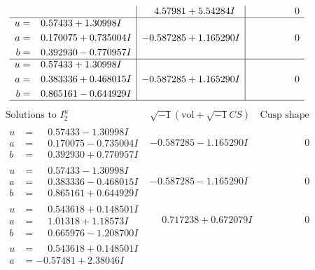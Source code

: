 \documentclass[1p]{elsarticle_modified}
\theoremstyle{definition}
\newcommand{\I}{\sqrt{-1}}
\begin{document}
$$\begin{array}{c|c|c}
 & \phantom{-}4.57981 + 5.54284 I & \phantom{-0.000000 } 0 \\ \hline\begin{aligned}
u &= \phantom{-}0.57433 + 1.30998 I \\
a &= \phantom{-}0.170075 + 0.735004 I \\
b &= \phantom{-}0.392930 - 0.770957 I\end{aligned}
 & -0.587285 + 1.165290 I & \phantom{-0.000000 } 0 \\ \hline\begin{aligned}
u &= \phantom{-}0.57433 + 1.30998 I \\
a &= \phantom{-}0.383336 + 0.468015 I \\
b &= \phantom{-}0.865161 - 0.644929 I\end{aligned}
 & -0.587285 + 1.165290 I & \phantom{-0.000000 } 0\\
 \hline 
 \end{array}$$\newpage$$\begin{array}{c|c|c}  
\text{Solutions to }I^u_{2}& \I (\text{vol} + \sqrt{-1}CS) & \text{Cusp shape}\\
 \hline 
\begin{aligned}
u &= \phantom{-}0.57433 - 1.30998 I \\
a &= \phantom{-}0.170075 - 0.735004 I \\
b &= \phantom{-}0.392930 + 0.770957 I\end{aligned}
 & -0.587285 - 1.165290 I & \phantom{-0.000000 } 0 \\ \hline\begin{aligned}
u &= \phantom{-}0.57433 - 1.30998 I \\
a &= \phantom{-}0.383336 - 0.468015 I \\
b &= \phantom{-}0.865161 + 0.644929 I\end{aligned}
 & -0.587285 - 1.165290 I & \phantom{-0.000000 } 0 \\ \hline\begin{aligned}
u &= \phantom{-}0.543618 + 0.148501 I \\
a &= \phantom{-}1.01318 + 1.18573 I \\
b &= \phantom{-}0.665976 - 1.208700 I\end{aligned}
 & \phantom{-}0.717238 + 0.672079 I & \phantom{-0.000000 } 0 \\ \hline\begin{aligned}
u &= \phantom{-}0.543618 + 0.148501 I \\
a &= -0.57481 + 2.38046 I \\

\end{aligned}
\end{array}$$
\end{document}
